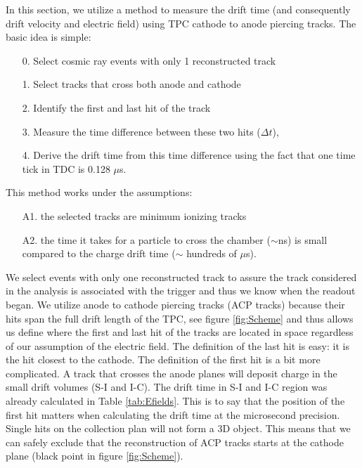 In this section, we utilize a method to measure the drift time (and consequently drift velocity and electric field) using TPC cathode to anode piercing tracks.
The basic idea is simple:
\begin{itemize}
\item[0.] Select cosmic ray events with only 1 reconstructed track 
\item[1.] Select tracks that cross both anode and cathode
\item[2.] Identify the first and last hit of the track
\item[3.] Measure the time difference between these two hits ($\Delta t$),
\item[4.] Derive the drift time from this time difference using the fact that one time tick in TDC is 0.128 $\mu$s.
\end{itemize}
This method works under the assumptions: 
\begin{itemize}
\item [A1.] the selected tracks are minimum ionizing tracks
\item [A2.] the time it takes for a particle to cross the chamber ($\sim$ns) is small compared to the charge drift time ($\sim$ hundreds of $\mu$s).
\end{itemize}

We select events with only one reconstructed track to assure the track considered in the analysis is associated with the trigger and thus we know when the readout began. We utilize anode to cathode piercing tracks (ACP tracks) because their hits span the full drift length of the TPC, see figure \ref{fig:Scheme} and thus allows us define where the first and last hit of the tracks are located in space regardless of our assumption of the electric field. The definition of the last hit is easy: it is the hit closest to the cathode. The definition of the first hit is a bit more complicated. A track that crosses the anode planes will deposit charge in the small drift volumes (S-I and I-C). The drift time in S-I and I-C region was already calculated in Table \ref{tab:Efields}. This is to say that the position of the first hit matters when calculating the drift time at the microsecond precision.
Single hits on the collection plan will not form a 3D object. This means that we can safely exclude that the reconstruction of ACP tracks starts at the cathode plane (black point in figure \ref{fig:Scheme}). %


